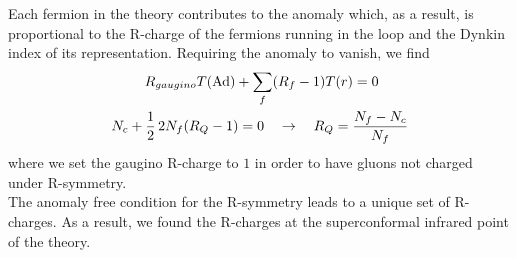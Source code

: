 Each fermion in the theory contributes to the anomaly which, as a result, is proportional to the R-charge of the fermions running in the loop and the Dynkin index of its representation.
Requiring the anomaly to vanish, we find
\begin{align}
R_{gaugino} T (\hbox{Ad}) + \sum_{ f} (& R_{f} - 1)  T(r)   = 0 
\label{eqn:r_symm_anom_condition}
\\
N_c + \frac{1}{2}\,  2 N_f (R_Q -1)  = 0 \quad & \rightarrow \quad R_Q = \frac{N_f - N_c}{N_f}
\end{align}
where we set the gaugino R-charge to $1$ in order to have gluons not charged under R-symmetry.
\\
 The anomaly free condition for the R-symmetry leads to a unique set of R-charges. As a result, we found the R-charges at the superconformal infrared point of the theory.



